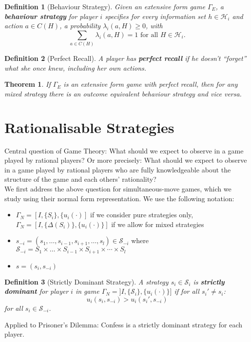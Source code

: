 \documentclass[12pt]{extreport} %
\theoremstyle{named}
\theoremstyle{itshape}
\newtheorem{theorem}[unnamedtheorem]{Theorem}
\newtheorem*{definition}{Definition}
\theoremstyle{normal}
\begin{document}
\begin{definition}[Behaviour Strategy]
	Given an extensive form game $\Gamma_E$, a \textbf{behaviour strategy} for player $i$ specifies for every information set $h \in \mathcal{H}_i$ and action $a \in C(H)$, a probability $\lambda_i(a, H) \geq 0$, with
	$$ \sum_{a \in C(H)} \lambda_i(a, H) = 1 \text{ for all } H \in \mathcal{H}_i. $$
\end{definition}

\begin{definition}[Perfect Recall]
	A player has \textbf{perfect recall} if he doesn't \enquote{forget} what she once knew, including her own actions.
\end{definition}

\begin{theorem}
	If $\Gamma_E$ is an extensive form game with perfect recall, then for any mixed strategy there is an outcome equivalent behaviour strategy and vice versa.	
\end{theorem}

\section{Rationalisable Strategies}

Central question of Game Theory: What should we expect to observe in a game played by rational players? Or more precisely: What should we expect to observe in a game played by rational players who are fully knowledgeable about the structure of the game and each others' rationality? ~\\

We first address the above question for simultaneous-move games, which we study using their normal form representation. We use the following notation:
\begin{itemize}
	\item $\Gamma_N = [I, \{ S_i \}, \{ u_i(\cdot)]$ if we consider pure strategies only, ~\\
		$\Gamma_{N} = [I, \{ \Delta(S_i)\}, \{ u_i(\cdot) \}]$ if we allow for mixed strategies
	\item $s_{-i} = (s_1, \dotsc, s_{i-1}, s_{i+1}, \dotsc, s_l) \in \mathcal{S}_{-i}$ where $\mathcal{S}_{-i} = S_1 \times \dotsc \times S_{i-1} \times S_{i+1} \times \cdots \times S_{l}$
	\item $s = (s_i, s_{-i})$
\end{itemize}

\begin{definition}[Strictly Dominant Strategy]
	A strategy $s_i \in \mathcal{S}_i$ is \textbf{strictly dominant} for player $i$ in game $\Gamma_N = ]I, \{  \mathcal{S}_i \}, \{ u_i(\cdot)\}]$ if for all $s_i' \neq s_i$:
	$$ u_{i}(s_i, s_{-i}) > u_i(s_i', s_{-i})  $$
	for all $s_{i} \in \mathcal{S}_{-i}$.
\end{definition}
Applied to Prisoner's Dilemma: Confess is a strictly dominant strategy for each player.
\end{document}
